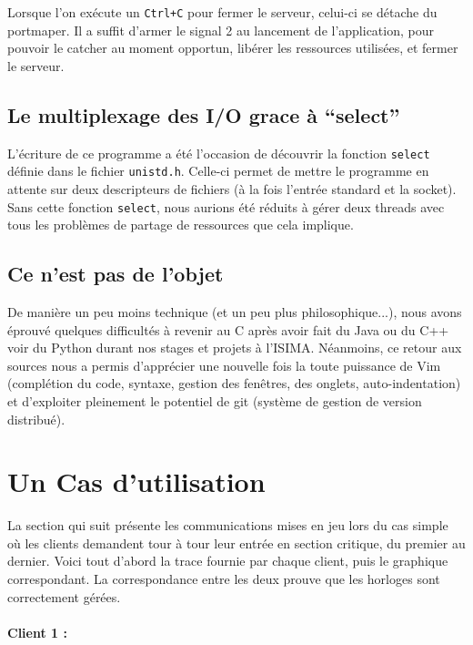 Lorsque l'on exécute un \verb|Ctrl+C| pour fermer le serveur, celui-ci se détache du portmaper. Il a suffit d'armer le signal 2 au lancement de l'application, pour pouvoir le catcher au moment opportun, libérer les ressources utilisées, et fermer le serveur.

\subsection{Le multiplexage des I/O grace à ``select''}

L'écriture de ce programme a été l'occasion de découvrir la fonction \verb|select| définie dans le fichier \verb|unistd.h|. Celle-ci permet de mettre le programme en attente sur deux descripteurs de fichiers (à la fois l'entrée standard et la socket). Sans cette fonction \verb|select|, nous aurions été réduits à gérer deux threads avec tous les problèmes de partage de ressources que cela implique.

\subsection{Ce n'est pas de l'objet}

De manière un peu moins technique (et un peu plus philosophique...), nous avons éprouvé quelques difficultés à revenir au C après avoir fait du Java ou du C++ voir du Python durant nos stages et projets à l'ISIMA. Néanmoins, ce retour aux sources nous a permis d'apprécier une nouvelle fois la toute puissance de Vim (complétion du code, syntaxe, gestion des fenêtres, des onglets, auto-indentation) et d'exploiter pleinement le potentiel de git (système de gestion de version distribué).

\section{Un Cas d'utilisation}

La section qui suit présente les communications mises en jeu lors du cas simple où les clients demandent tour à tour leur entrée en section critique, du premier au dernier. Voici tout d'abord la trace fournie par chaque client, puis le graphique correspondant. La correspondance entre les deux prouve que les horloges sont correctement gérées.

\paragraph{Client 1 : \\}

